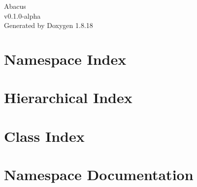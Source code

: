 \let\mypdfximage\pdfximage\def\pdfximage{\immediate\mypdfximage}\documentclass[twoside]{book}
\newcommand{\+}{\discretionary{\mbox{\scriptsize$\hookleftarrow$}}{}{}}
\newcommand{\clearemptydoublepage}{%
  \newpage{\pagestyle{empty}\cleardoublepage}%
}
\begin{document}
\hypersetup{pageanchor=false,
             bookmarksnumbered=true,
             pdfencoding=unicode
            }
\begin{titlepage}
\vspace*{7cm}
\begin{center}%
{\Large Abacus \\[1ex]\large v0.\+1.\+0-\/alpha }\\
\vspace*{1cm}
{\large Generated by Doxygen 1.8.18}\\
\end{center}
\end{titlepage}
\clearemptydoublepage
{}
\tableofcontents
\clearemptydoublepage
{}
\hypersetup{pageanchor=true}

\chapter{Namespace Index}

\chapter{Hierarchical Index}

\chapter{Class Index}

\chapter{Namespace Documentation}






\end{document}
